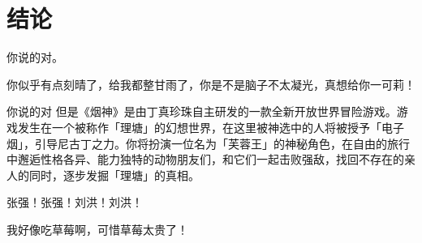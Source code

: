 

\chapter*{结\quad 论}

你说的对。

你似乎有点刻晴了，给我都整甘雨了，你是不是脑子不太凝光，真想给你一可莉！

你说的对 但是《烟神》是由丁真珍珠自主研发的一款全新开放世界冒险游戏。游戏发生在一个被称作「理塘」的幻想世界，在这里被神选中的人将被授予「电子烟」，引导尼古丁之力。你将扮演一位名为「芙蓉王」的神秘角色，在自由的旅行中邂逅性格各异、能力独特的动物朋友们，和它们一起击败强敌，找回不存在的亲人的同时，逐步发掘「理塘」的真相。

张强！张强！刘洪！刘洪！

我好像吃草莓啊，可惜草莓太贵了！

